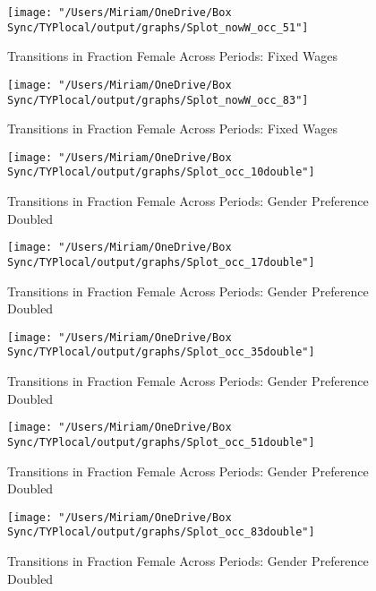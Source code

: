 \documentclass[12pt]{article}
\begin{document}
\begin{figure}[H]
\centering
\caption{Transitions in Fraction Female Across Periods: Fixed Wages}
\label{ftransitions51}
\texttt{[image: "/Users/Miriam/OneDrive/Box Sync/TYPlocal/output/graphs/Splot\_nowW\_occ\_51"]}
\end{figure}

\begin{figure}[H]
\centering
\caption{Transitions in Fraction Female Across Periods: Fixed Wages}
\label{ftransitions83}
\texttt{[image: "/Users/Miriam/OneDrive/Box Sync/TYPlocal/output/graphs/Splot\_nowW\_occ\_83"]}
\end{figure}


\begin{figure}[H]
\centering
\caption{Transitions in Fraction Female Across Periods: Gender Preference Doubled}
\label{ftransitions10}
\texttt{[image: "/Users/Miriam/OneDrive/Box Sync/TYPlocal/output/graphs/Splot\_occ\_10double"]}
\end{figure}

\begin{figure}[H]
\centering
\caption{Transitions in Fraction Female Across Periods: Gender Preference Doubled}
\label{ftransitions17}
\texttt{[image: "/Users/Miriam/OneDrive/Box Sync/TYPlocal/output/graphs/Splot\_occ\_17double"]}
\end{figure}

\begin{figure}[H]
\centering
\caption{Transitions in Fraction Female Across Periods: Gender Preference Doubled}
\label{ftransitions35}
\texttt{[image: "/Users/Miriam/OneDrive/Box Sync/TYPlocal/output/graphs/Splot\_occ\_35double"]}
\end{figure}

\begin{figure}[H]
\centering
\caption{Transitions in Fraction Female Across Periods: Gender Preference Doubled}
\label{ftransitions51}
\texttt{[image: "/Users/Miriam/OneDrive/Box Sync/TYPlocal/output/graphs/Splot\_occ\_51double"]}
\end{figure}

\begin{figure}[H]
\centering
\caption{Transitions in Fraction Female Across Periods: Gender Preference Doubled}
\label{ftransitions83}
\texttt{[image: "/Users/Miriam/OneDrive/Box Sync/TYPlocal/output/graphs/Splot\_occ\_83double"]}
\end{figure}
\end{document}
